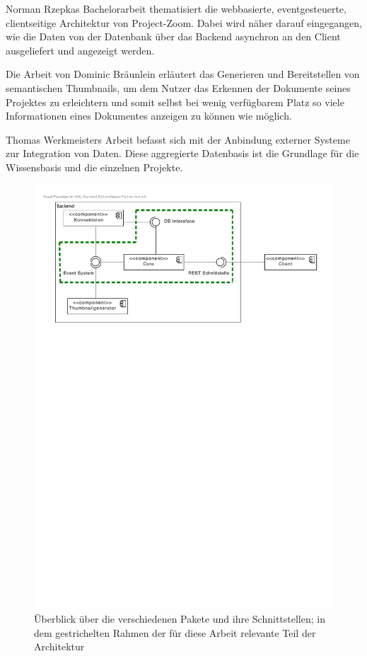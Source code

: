 Norman Rzepkas Bachelorarbeit \cite{bp-norman} thematisiert die webbasierte, eventgesteuerte, clientseitige Architektur von Project-Zoom. Dabei wird näher darauf eingegangen, wie die Daten von der Datenbank über das \gls{Backend} asynchron an den Client ausgeliefert und angezeigt werden.

Die Arbeit von Dominic Bräunlein \cite{bp-dome} erläutert das Generieren und Bereitstellen von semantischen Thumbnails, um dem Nutzer das Erkennen der Dokumente seines Projektes zu erleichtern und somit selbst bei wenig verfügbarem Platz so viele Informationen eines Dokumentes anzeigen zu können wie möglich. 

Thomas Werkmeisters Arbeit \cite{bp-tewe} befasst sich mit der Anbindung externer Systeme zur Integration von Daten. Diese aggregierte Datenbasis ist die Grundlage für die Wissensbasis und die einzelnen Projekte.

\begin{figure}[ht]  
  \centering     
  \includegraphics[width=1.0\textwidth]{img/architecture_overview.pdf}  
   \caption{Überblick über die verschiedenen Pakete und ihre Schnittstellen; in dem gestrichelten Rahmen der für diese Arbeit relevante Teil der Architektur}
  \label{fig:architecture-overview} 
\end{figure}

